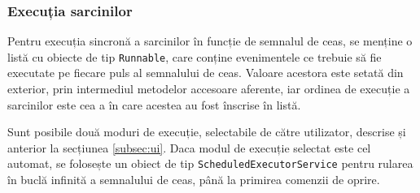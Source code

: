 \documentclass{article}
\begin{document}
\subsubsection*{Execuția sarcinilor}
Pentru execuția sincronă a sarcinilor în funcție de semnalul de ceas, se menține o listă cu obiecte de tip \texttt{Runnable}, care conține evenimentele ce trebuie să fie executate pe fiecare puls al semnalului de ceas. Valoare acestora este setată din exterior, prin intermediul metodelor accesoare aferente, iar ordinea de execuție a sarcinilor este cea a în care acestea au fost înscrise în listă.

Sunt posibile două moduri de execuție, selectabile de către utilizator, descrise și anterior la secțiunea \ref{subsec:ui}. Daca modul de execuție selectat este cel automat, se folosește un obiect de tip \texttt{ScheduledExecutorService} pentru rularea în buclă infinită a semnalului de ceas, până la primirea comenzii de oprire.
\end{document}
